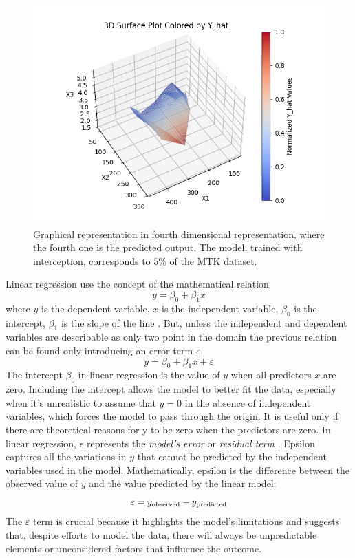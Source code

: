 \documentclass[9pt,technote]{IEEEtran}
\begin{document}
		\begin{figure}
			\centering
  			\includegraphics[width=1\linewidth]{figures/mkt4dim_with_intercept.png}
  			\caption{Graphical representation in fourth dimensional representation, where the fourth one is the predicted output. The model, trained with interception, corresponds to $5\%$ of the MTK dataset.}
  			\label{fig::mkt4dim_with_intercept}
		\end{figure}	
		
	Linear regression use the concept of the mathematical relation  
		\begin{equation*}
			y = \beta_0 + \beta_1 x
		\end{equation*}
	where  $y$  is the dependent variable,  $x$  is the independent variable, $\beta_0$  is the intercept,  $\beta_1$  is the slope of the line \cite{james2021LinearRegression}. But, unless the independent and dependent variables are describable as only two point in the domain the previous relation can be found only introducing an error term $\varepsilon$.
		\begin{equation}
			y = \beta_0 + \beta_1 x + \varepsilon
		\end{equation}
	The intercept $\beta_0$ in linear regression is the value of $y$ when all predictors $x$ are zero. Including the intercept allows the model to better fit the data, especially when it’s unrealistic to assume that $y = 0$ in the absence of independent variables, which forces the model to pass through the origin. It is useful only if there are theoretical reasons for y to be zero when the predictors are zero.
	In linear regression, $\epsilon$ represents the \textit{model's error} or \textit{residual term} \cite{james2021LinearRegression}. Epsilon captures all the variations in $y$ that cannot be predicted by the independent variables used in the model.
	Mathematically, epsilon is the difference between the observed value of $y$ and the value predicted by the linear model:
	\begin{equation*}
		\varepsilon= y_{\tiny\text{observed}} - y_{\tiny\text{predicted}}
	\end{equation*}
	The $\varepsilon$ term is crucial because it highlights the model's limitations and suggests that, despite efforts to model the data, there will always be unpredictable elements or unconsidered factors that influence the outcome.
\end{document}
